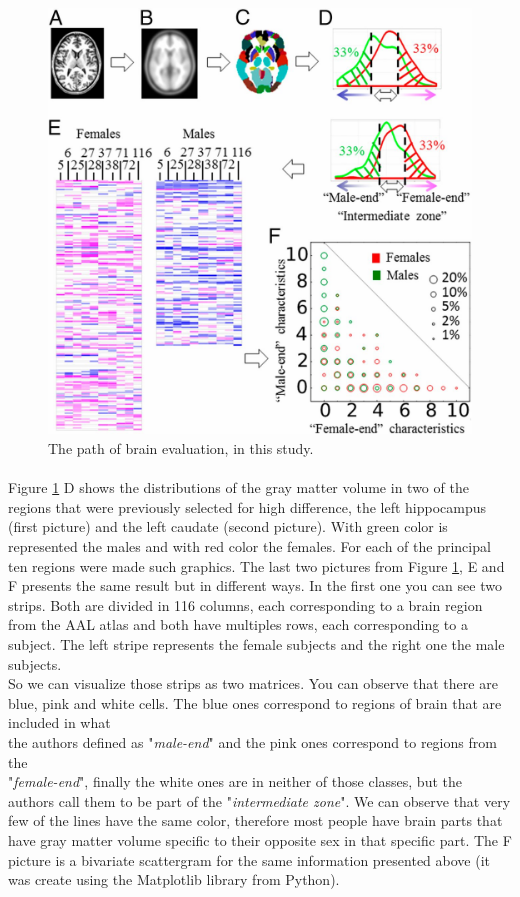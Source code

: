 \documentclass[paper=a4, fontsize=11pt]{scrartcl} %
\numberwithin{equation}{section} %
\numberwithin{figure}{section} %
\numberwithin{table}{section} %
\newcommand{\itl}{\textit}
\begin{document}
		
		\begin{figure}[h!]
			\centering
			\includegraphics[scale=0.82]	{paperGraphics.jpg}
			\caption{The path of brain evaluation, in this study. }
 		
  			\label{fig:graphics}
  			
		\end{figure}
		\paragraph{}
		Figure \ref{fig:graphics} D shows the distributions of the gray matter volume in two of the regions that were previously selected for high difference, the left hippocampus (first picture) and the left caudate (second picture). With green color is represented the males and with red color the females. For each of the principal ten regions were made such graphics.
		The last two pictures from Figure \ref{fig:graphics}, E and F presents  the same result but in different ways. In the first one you can see two strips. Both are divided in 116 columns, each corresponding to a brain region from the AAL atlas \cite{AAL} and both have multiples rows, each corresponding to a subject. The left stripe represents the female subjects and the right one the male subjects.\\
		So we can visualize those strips as two matrices.  You can observe that there are blue, pink and white cells. The blue ones correspond to regions of brain that are included in what \\the authors defined as "\itl{male-end}" and the pink ones correspond to regions from the\\ "\itl{female-end}", finally the white ones  are in neither of those classes, but the authors call them to be part of the "\itl{intermediate zone}". We can observe that very few of the lines have the same color, therefore most people have brain parts that have gray matter volume specific to their opposite sex in that specific part.
		The F picture is a bivariate scattergram for the same information presented above (it was create using the Matplotlib library from Python).
\end{document}
